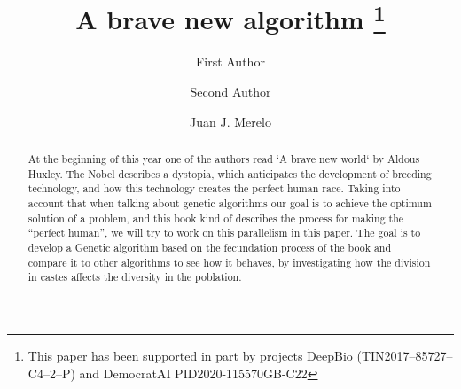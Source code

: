 \documentclass[runningheads]{llncs}
\begin{document}
%
\title{A brave new algorithm \thanks{This paper has been supported in part by projects DeepBio (TIN2017--85727--C4--2--P) and DemocratAI PID2020-115570GB-C22}}
%
%
\author{First Author \and
Second Author \and
Juan J. Merelo}
%
%
%
\maketitle              %
%
\begin{abstract}

At the beginning of this year one of the authors read `A brave new
world` by Aldous Huxley.  The Nobel describes a dystopia, which
anticipates the development of breeding technology, and how this
technology creates the perfect human race. Taking into account that
when talking about genetic algorithms our goal is to achieve the
optimum solution of a problem, and this book kind of describes the
process for making the “perfect human”, we will try to work on this
parallelism in this paper. The goal is to develop a Genetic algorithm
based on the fecundation process of the book and compare it to other
algorithms to see how it behaves, by investigating how the division in
castes affects the diversity in the poblation.

\end{abstract}
%
%
%

% 








\end{document}
